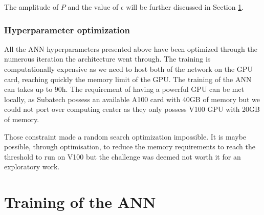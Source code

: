 \documentclass[../main.tex]{subfiles}
\begin{document}
The amplitude of $P$ and the value of $\epsilon$ will be further discussed in Section \ref{sec:janne:arch:training}.

\subsubsection{Hyperparameter optimization}

All the ANN hyperparameters presented above have been optimized through the numerous iteration the architecture went through. The training is computationally expensive as we need to host both of the network on the GPU card, reaching quickly the memory limit of the GPU. The training of the ANN can takes up to 90h. The requirement of having a powerful GPU can be met locally, as Subatech possess an available A100 \cite{noauthor_nvidia_nodate-1} card with 40GB of memory but we could not port over computing center as they only possess V100 \cite{noauthor_nvidia_nodate-2} GPU with 20GB of memory.

Those constraint made a random search optimization impossible. It is maybe possible, through optimisation, to reduce the memory requirements to reach the threshold to run on V100 but the challenge was deemed not worth it for an exploratory work.

\section{Training of the ANN}
\label{sec:janne:arch:training}
\end{document}
